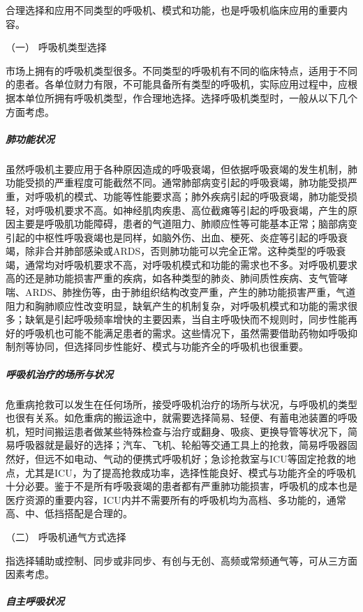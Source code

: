 合理选择和应用不同类型的呼吸机、模式和功能，也是呼吸机临床应用的重要内容。

\hypertarget{text00368.htmlux5cux23CHP16-3-2-3-1}{}
（一） 呼吸机类型选择

市场上拥有的呼吸机类型很多。不同类型的呼吸机有不同的临床特点，适用于不同的患者。各单位财力有限，不可能具备所有类型的呼吸机，实际应用过程中，应根据本单位所拥有呼吸机类型，作合理地选择。选择呼吸机类型时，一般从以下几个方面考虑。

\subparagraph{肺功能状况}

虽然呼吸机主要应用于各种原因造成的呼吸衰竭，但依据呼吸衰竭的发生机制，肺功能受损的严重程度可能截然不同。通常肺部病变引起的呼吸衰竭，肺功能受损严重，对呼吸机的模式、功能等性能要求高；肺外疾病引起的呼吸衰竭，肺功能受损轻，对呼吸机要求不高。如神经肌肉疾患、高位截瘫等引起的呼吸衰竭，产生的原因主要是呼吸肌功能障碍，患者的气道阻力、肺顺应性等可能基本正常；脑部病变引起的中枢性呼吸衰竭也是同样，如脑外伤、出血、梗死、炎症等引起的呼吸衰竭，除非合并肺部感染或ARDS，否则肺功能可以完全正常。这种类型的呼吸衰竭，通常均对呼吸机要求不高，对呼吸机模式和功能的需求也不多。对呼吸机要求高的还是肺功能损害严重的疾病，如各种类型的肺炎、肺间质性疾病、支气管哮喘、ARDS、肺挫伤等，由于肺组织结构改变严重，产生的肺功能损害严重，气道阻力和胸肺顺应性改变明显，缺氧产生的机制复杂，对呼吸机模式和功能的需求很多；缺氧是引起呼吸频率增快的主要因素，当自主呼吸快而不规则时，同步性能再好的呼吸机也可能不能满足患者的需求。这些情况下，虽然需要借助药物如呼吸抑制剂等协同，但选择同步性能好、模式与功能齐全的呼吸机也很重要。

\subparagraph{呼吸机治疗的场所与状况}

危重病抢救可以发生在任何场所，接受呼吸机治疗的场所与状况，与呼吸机的类型也很有关系。如危重病的搬运途中，就需要选择简易、轻便、有蓄电池装置的呼吸机，短时间搬运患者做某些特殊检查与治疗或翻身、吸痰、更换导管等状况下，简易呼吸器就是最好的选择；汽车、飞机、轮船等交通工具上的抢救，简易呼吸器固然好，但远不如电动、气动的便携式呼吸机好；急诊抢救室与ICU等固定抢救的地点，尤其是ICU，为了提高抢救成功率，选择性能良好、模式与功能齐全的呼吸机十分必要。鉴于不是所有呼吸衰竭的患者都有严重肺功能损害，呼吸机的成本也是医疗资源的重要内容，ICU内并不需要所有的呼吸机均为高档、多功能的，通常高、中、低挡搭配是合理的。

\hypertarget{text00368.htmlux5cux23CHP16-3-2-3-2}{}
（二） 呼吸机通气方式选择

指选择辅助或控制、同步或非同步、有创与无创、高频或常频通气等，可从三方面因素考虑。

\subparagraph{自主呼吸状况}

